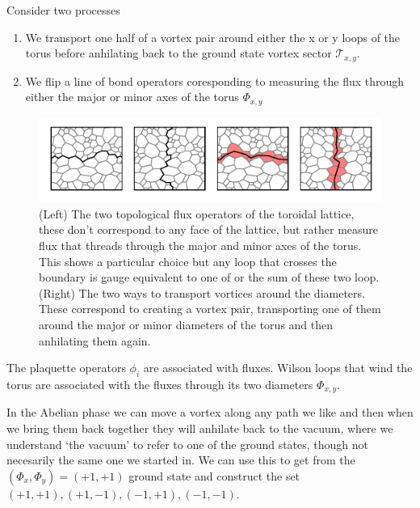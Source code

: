 Consider two processes

\begin{enumerate}
\def\labelenumi{\arabic{enumi})}
\item
  We transport one half of a vortex pair around either the x or y loops
  of the torus before anhilating back to the ground state vortex sector
  \(\mathcal{T}_{x,y}\).
\item
  We flip a line of bond operators coresponding to measuring the flux
  through either the major or minor axes of the torus
  \(\mathcal{\Phi}_{x,y}\)
\end{enumerate}

\begin{figure}
\hypertarget{fig:loops_and_dual_loops}{%
\centering
\includegraphics[width=1.14\textwidth,height=\textheight]{figure_code/amk_chapter/loops_and_dual_loops/loops_and_dual_loops.pdf}
\caption{(Left) The two topological flux operators of the toroidal
lattice, these don't correspond to any face of the lattice, but rather
measure flux that threads through the major and minor axes of the torus.
This shows a particular choice but any loop that crosses the boundary is
gauge equivalent to one of or the sum of these two loop. (Right) The two
ways to transport vortices around the diameters. These correspond to
creating a vortex pair, transporting one of them around the major or
minor diameters of the torus and then anhilating them
again.}\label{fig:loops_and_dual_loops}
}
\end{figure}

The plaquette operators \(\phi_i\) are associated with fluxes. Wilson
loops that wind the torus are associated with the fluxes through its two
diameters \(\mathcal{\Phi}_{x,y}\).

In the Abelian phase we can move a vortex along any path we like and
then when we bring them back together they will anhilate back to the
vacuum, where we understand `the vacuum' to refer to one of the ground
states, though not necesarily the same one we started in. We can use
this to get from the \((\Phi_x, \Phi_y) = (+1, +1)\) ground state and
construct the set \((+1, +1), (+1, -1), (-1, +1), (-1, -1)\).

